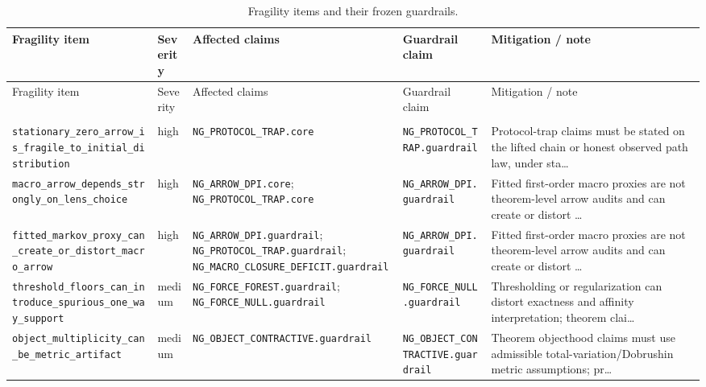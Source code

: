 {\footnotesize
\begin{longtable}{>{\raggedright\arraybackslash}p{} >{\raggedright\arraybackslash}p{} >{\raggedright\arraybackslash}p{} >{\raggedright\arraybackslash}p{} >{\raggedright\arraybackslash}p{}}
\caption{Fragility items and their frozen guardrails.}\label{tab:fragility-map}\\
\toprule
Fragility item & Severity & Affected claims & Guardrail claim & Mitigation / note\\
\midrule
\endfirsthead
\toprule
Fragility item & Severity & Affected claims & Guardrail claim & Mitigation / note\\
\midrule
\endhead
\midrule
\multicolumn{5}{r}{Continued on next page}\\
\midrule
\endfoot
\bottomrule
\endlastfoot
\texttt{stationary\_zero\_arrow\_is\_fragile\_to\_initial\_distribution} & high & \texttt{NG\_PROTOCOL\_TRAP.core} & \texttt{NG\_PROTOCOL\_TRAP.guardrail} & Protocol-trap claims must be stated on the lifted chain or honest observed path law, under sta…\\
\texttt{macro\_arrow\_depends\_strongly\_on\_lens\_choice} & high & \texttt{NG\_ARROW\_DPI.core}; \texttt{NG\_PROTOCOL\_TRAP.core} & \texttt{NG\_ARROW\_DPI.guardrail} & Fitted first-order macro proxies are not theorem-level arrow audits and can create or distort …\\
\texttt{fitted\_markov\_proxy\_can\_create\_or\_distort\_macro\_arrow} & high & \texttt{NG\_ARROW\_DPI.guardrail}; \texttt{NG\_PROTOCOL\_TRAP.guardrail}; \texttt{NG\_MACRO\_CLOSURE\_DEFICIT.guardrail} & \texttt{NG\_ARROW\_DPI.guardrail} & Fitted first-order macro proxies are not theorem-level arrow audits and can create or distort …\\
\texttt{threshold\_floors\_can\_introduce\_spurious\_one\_way\_support} & medium & \texttt{NG\_FORCE\_FOREST.guardrail}; \texttt{NG\_FORCE\_NULL.guardrail} & \texttt{NG\_FORCE\_NULL.guardrail} & Thresholding or regularization can distort exactness and affinity interpretation; theorem clai…\\
\texttt{object\_multiplicity\_can\_be\_metric\_artifact} & medium & \texttt{NG\_OBJECT\_CONTRACTIVE.guardrail} & \texttt{NG\_OBJECT\_CONTRACTIVE.guardrail} & Theorem objecthood claims must use admissible total-variation/Dobrushin metric assumptions; pr…\\
\end{longtable}
}
